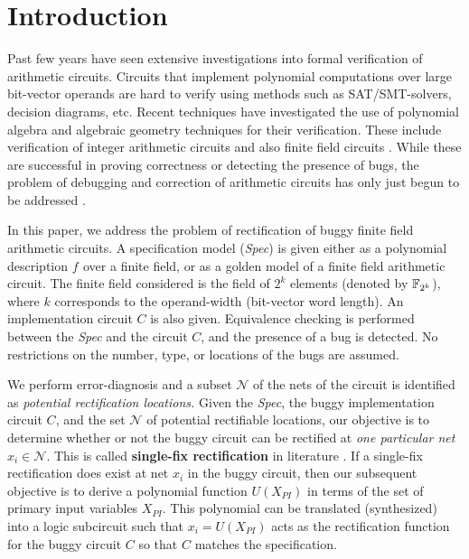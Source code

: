 \section{Introduction}

Past few years have seen extensive investigations into formal
verification of arithmetic circuits. Circuits that implement
polynomial computations over large bit-vector operands are hard to
verify using methods such as SAT/SMT-solvers, decision diagrams,
etc. Recent techniques have investigated the use of polynomial algebra
and algebraic geometry techniques for their verification. These
include verification of integer arithmetic circuits
\cite{Armin2017ColumnWiseVO} \cite{maciej:2015} \cite{rolf:2016} and
also finite field circuits \cite{lv:tcad2013}
\cite{blueveri:fmsd}. While these are successful in proving
correctness or detecting the presence of bugs, the problem of
debugging and correction of arithmetic circuits has only just begun to
be addressed \cite{farimah:2017:1,farimah:2016}. 

In this paper, we address the problem of rectification of buggy finite
field arithmetic circuits. A specification model ({\it Spec}) is given
either as a  polynomial description $f_{}$ over a finite field, or as a
golden model of a finite field arithmetic circuit. The finite field
considered is the field of $2^k$ elements (denoted by ${\mathbb{F}}_{2^k}$), where
$k$ corresponds to the operand-width (bit-vector word length). An
  implementation circuit $C$ is also given. Equivalence checking is performed between the {\it Spec} and the
  circuit $C$, and the presence of a bug is detected. No restrictions
  on the number, type, or locations of the bugs are assumed.

We perform error-diagnosis and a subset   $\mathcal{N}$ of the nets of
the circuit is identified as {\it potential rectification locations.}
Given the {\it Spec}, the buggy implementation circuit $C$, and the set
$\mathcal{N}$ of potential rectifiable locations, our objective is to determine
whether or not the buggy circuit can be rectified at {\it one
  particular net $x_i\in \mathcal{N}$}. This is called {\bf
  single-fix rectification} in literature \cite{Huang:DAC2011}. If a
single-fix rectification does exist at net $x_i$ in the buggy circuit,
then our subsequent objective is to derive a polynomial function
$U(X_{PI})$ in terms of the set of primary input variables
$X_{PI}$. This polynomial can be translated (synthesized) into a logic
subcircuit such that $x_i = U(X_{PI})$ acts as the rectification
function for the buggy circuit $C$ so that $C$ matches the
specification. 

